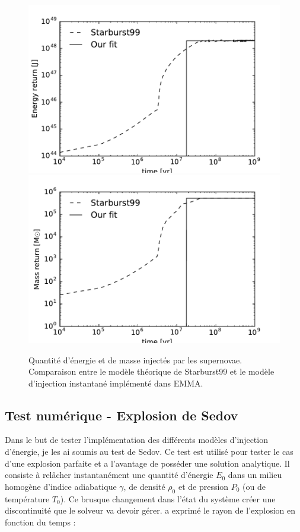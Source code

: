 \begin{figure}
        \includegraphics[width=.95\textwidth]{img/03/energy_loss.pdf} 
		\includegraphics[width=.95\textwidth]{img/03/mass_loss.pdf} 
        \caption[Calibration des supernovæ]{ Quantité d'énergie et de masse injectés par les supernovae. 
        Comparaison entre le modèle théorique de Starburst99 et le modèle d'injection instantané implémenté dans EMMA.
 		\label{fig:SNloss}}
\end{figure}

\subsection{Test numérique - Explosion de Sedov}
\label{sec:sedov}


Dans le but de tester l'implémentation des différents modèles d'injection d'énergie, je les ai soumis au test de Sedov.
Ce test est utilisé pour tester le cas d'une explosion parfaite et a l'avantage de posséder une solution analytique.
Il consiste à relâcher instantanément une quantité d'énergie $E_0$ dans un milieu homogène d'indice adiabatique $\gamma$, de densité $\rho_0$ et de pression $P_0$ (ou de température $T_0$).
Ce brusque changement dans l'état du système créer une discontinuité que le solveur va devoir gérer.
\cite{sedov_similarity_1959} a exprimé le rayon de l'explosion en fonction du temps  : 

